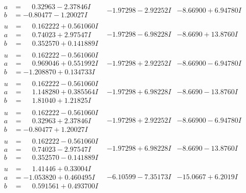 \documentclass[1p]{elsarticle_modified}
\theoremstyle{definition}
\begin{document}
$$\begin{array}{c|c|c}
\begin{aligned}
a &= \phantom{-}0.32963 - 2.37846 I \\
b &= -0.80477 - 1.20027 I\end{aligned}
 & -1.97298 - 2.92252 I & -8.66900 + 6.94780 I \\ \hline\begin{aligned}
u &= \phantom{-}0.162222 + 0.561060 I \\
a &= \phantom{-}0.74023 + 2.97547 I \\
b &= \phantom{-}0.352570 + 0.141889 I\end{aligned}
 & -1.97298 - 6.98228 I & -8.6690 + 13.8760 I \\ \hline\begin{aligned}
u &= \phantom{-}0.162222 - 0.561060 I \\
a &= \phantom{-}0.969046 + 0.551992 I \\
b &= -1.208870 + 0.134733 I\end{aligned}
 & -1.97298 + 2.92252 I & -8.66900 - 6.94780 I \\ \hline\begin{aligned}
u &= \phantom{-}0.162222 - 0.561060 I \\
a &= \phantom{-}1.148280 + 0.385564 I \\
b &= \phantom{-}1.81040 + 1.21825 I\end{aligned}
 & -1.97298 + 6.98228 I & -8.6690 - 13.8760 I \\ \hline\begin{aligned}
u &= \phantom{-}0.162222 - 0.561060 I \\
a &= \phantom{-}0.32963 + 2.37846 I \\
b &= -0.80477 + 1.20027 I\end{aligned}
 & -1.97298 + 2.92252 I & -8.66900 - 6.94780 I \\ \hline\begin{aligned}
u &= \phantom{-}0.162222 - 0.561060 I \\
a &= \phantom{-}0.74023 - 2.97547 I \\
b &= \phantom{-}0.352570 - 0.141889 I\end{aligned}
 & -1.97298 + 6.98228 I & -8.6690 - 13.8760 I \\ \hline\begin{aligned}
u &= \phantom{-}1.41446 + 0.33004 I \\
a &= -1.053820 + 0.460495 I \\
b &= \phantom{-}0.591561 + 0.493700 I\end{aligned}
 & -6.10599 - 7.35173 I & -15.0667 + 6.2019 I \\ \hline\begin{aligned}

\end{aligned}
\end{array}$$
\end{document}
